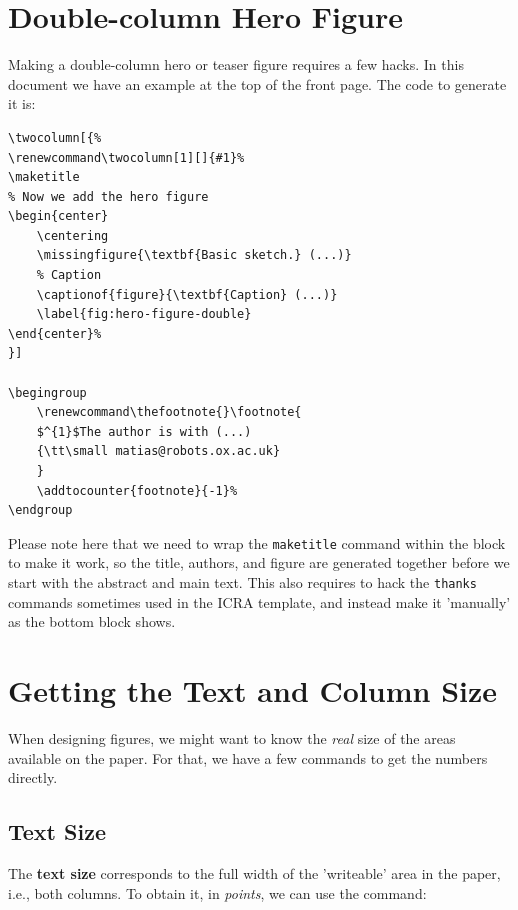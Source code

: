 \documentclass[letterpaper, 10 pt, conference]{ieeeconf}  %
\newlength\Size
\begin{document}
\section{Double-column Hero Figure}
Making a double-column hero or teaser figure requires a few hacks. In this document we have an example at the top of the front page. The code to generate it is:

\begin{footnotesize}
\begin{verbatim}
\twocolumn[{%
\renewcommand\twocolumn[1][]{#1}%
\maketitle
% Now we add the hero figure
\begin{center}
    \centering
    \missingfigure{\textbf{Basic sketch.} (...)}
    % Caption
    \captionof{figure}{\textbf{Caption} (...)}
    \label{fig:hero-figure-double}
\end{center}%
}]

\begingroup
    \renewcommand\thefootnote{}\footnote{
    $^{1}$The author is with (...)
    {\tt\small matias@robots.ox.ac.uk}
    }
    \addtocounter{footnote}{-1}%
\endgroup
\end{verbatim}
\end{footnotesize}

Please note here that we need to wrap the \texttt{maketitle} command within the block to make it work, so the title, authors, and figure are generated together before we start with the abstract and main text. This also requires to hack the \texttt{thanks} commands sometimes used in the ICRA template, and instead make it 'manually' as the bottom block shows.

\section{Getting the Text and Column Size}
When designing figures, we might want to know the \emph{real} size of the areas available on the paper. For that, we have a few commands to get the numbers directly.

\subsection{Text Size}
The \textbf{text size} corresponds to the full width of the 'writeable' area in the paper, i.e., both columns. To obtain it, in \emph{points}, we can use the command:
\end{document}
